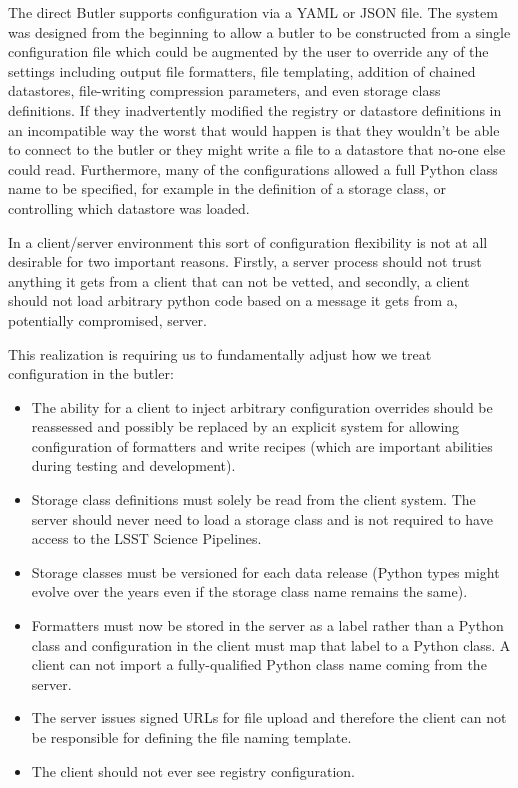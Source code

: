 The direct Butler supports configuration via a YAML or JSON file.
The system was designed from the beginning to allow a butler to be constructed from a single configuration file which could be augmented by the user to override any of the settings including output file formatters, file templating, addition of chained datastores, file-writing compression parameters, and even storage class definitions.
If they inadvertently modified the registry or datastore definitions in an incompatible way the worst that would happen is that they wouldn't be able to connect to the butler or they might write a file to a datastore that no-one else could read.
Furthermore, many of the configurations allowed a full Python class name to be specified, for example in the definition of a storage class, or controlling which datastore was loaded.

In a client/server environment this sort of configuration flexibility is not at all desirable for two important reasons.
Firstly, a server process should not trust anything it gets from a client that can not be vetted, and secondly, a client should not load arbitrary python code based on a message it gets from a, potentially compromised, server.

This realization is requiring us to fundamentally adjust how we treat configuration in the butler:

\begin{itemize}
\item The ability for a client to inject arbitrary configuration overrides should be reassessed and possibly be replaced by an explicit system for allowing configuration of formatters and write recipes (which are important abilities during testing and development).
\item Storage class definitions must solely be read from the client system.
  The server should never need to load a storage class and is not required to have access to the LSST Science Pipelines.
\item Storage classes must be versioned for each data release (Python types might evolve over the years even if the storage class name remains the same).
\item Formatters must now be stored in the server as a label rather than a Python class and configuration in the client must map that label to a Python class.
  A client can not import a fully-qualified Python class name coming from the server.
\item The server issues signed URLs for file upload and therefore the client can not be responsible for defining the file naming template.
\item The client should not ever see registry configuration.
\end{itemize}

